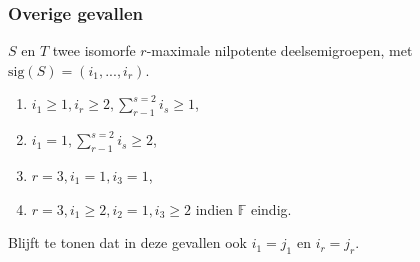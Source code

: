 \documentclass[12pt]{beamer}
\newcommand{\F}{\mathbb{F}}
\newcommand{\sig}{\mathrm{sig}}
\begin{document}
\begin{frame}
\frametitle{{\color{iets}Overige gevallen}}

\begin{block}{}
{\color{lightgray}$S$ en $T$ twee isomorfe $r$-maximale nilpotente deelsemigroepen, met $\sig(S) = (i_1, ...,i_r)$.}

\begin{enumerate}[-]
\item {\color{lightgray}$i_1 \geq 1, i_r \geq 2, \sum_{r-1}^{s=2} i_s \geq 1 $,}
\item {\color{lightgray}$i_1 = 1, \sum_{r-1}^{s=2} i_s \geq 2 $,}
\item {\color{lightgray}$r=3, i_1 = 1, i_3 = 1 $,}
\item {\color{lightgray}$r=3, i_1 \geq 2, i_2 = 1, i_3 \geq 2 $ indien $\F$ eindig.}
\end{enumerate}

\end{block}

\begin{block}{}
{\color{lightgray}Blijft te tonen dat in deze gevallen ook $i_1 = j_1$ en $i_r = j_r$.}
\end{block}

\end{frame}
\end{document}
